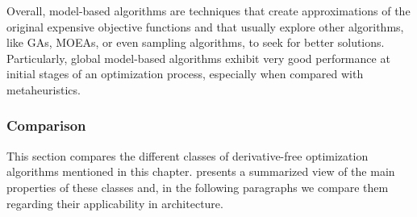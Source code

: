 	Overall, model-based algorithms are techniques that create approximations of the original expensive objective functions and that usually explore other algorithms, like \acp{GA}, \acp{MOEA}, or even sampling algorithms, to seek for better solutions. Particularly, global model-based algorithms exhibit very good performance at initial stages of an optimization process, especially when compared with metaheuristics. %
	
	\subsubsection{Comparison}
	\label{ssec:comparisondfo}
	
	This section compares the different classes of derivative-free optimization algorithms mentioned in this chapter.  presents a summarized view of the main properties of these classes and, in the following paragraphs we compare them regarding their applicability in architecture. 

